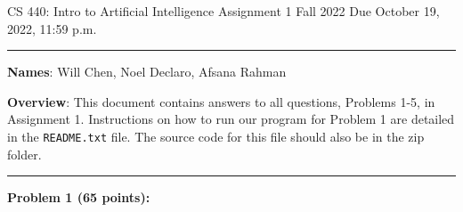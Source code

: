 \documentclass[12pt]{article}
\begin{document}
\noindent
CS 440: Intro to Artificial Intelligence \hfill Assignment 1\newline
Fall 2022 \hfill Due October 19, 2022, 11:59 p.m.

\noindent
\rule{\linewidth}{0.4pt}

\vspace{.5cm}

\textbf{Names}: Will Chen, Noel Declaro, Afsana Rahman

\vspace{.5cm}

\textbf{Overview}:  This document contains answers to all questions, Problems 1-5, in Assignment 1. Instructions on how to run our program for Problem 1 are detailed in the \texttt{README.txt} file. The source code for this file should also be in the zip folder. 

\noindent
\rule{\linewidth}{0.4pt}

\vspace{.5cm}

\textbf{Problem 1 (65 points):}
\end{document}
